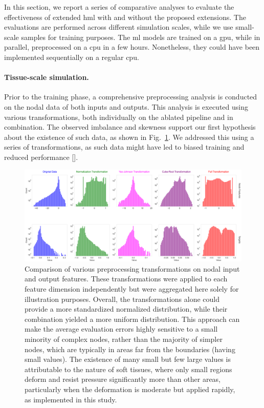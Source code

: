 In this section, we report a series of comparative analyses to evaluate the effectiveness of extended \ac{hml} with and without the proposed extensions. The evaluations are performed across different simulation scales, while we use small-scale samples for training purposes. The \ac{ml} models are trained on a \ac{gpu}, while in parallel, preprocessed on a \ac{cpu} in a few hours. Nonetheless, they could have been implemented sequentially on a regular \ac{cpu}.

\paragraph{Tissue-scale simulation.} Prior to the training phase, a comprehensive preprocessing analysis is conducted on the nodal data of both inputs and outputs. This analysis is executed using various transformations, both individually on the ablated pipeline and in combination. The observed imbalance and skewness support our first hypothesis about the existence of such data, as shown in Fig.~\ref{fig:normalization}. We addressed this using a series of transformations, as such data might have led to biased training and reduced performance [\cite{rezvani2023}].
%
\begin{figure}
    \centering
    \includegraphics[width=\textheight,keepaspectratio]{normalization.png}
    \caption{Comparison of various preprocessing transformations on nodal input and output features. These transformations were applied to each feature dimension independently but were aggregated here solely for illustration purposes. Overall, the transformations alone could provide a more standardized normalized distribution, while their combination yielded a more uniform distribution. This approach can make the average evaluation errors highly sensitive to a small minority of complex nodes, rather than the majority of simpler nodes, which are typically in areas far from the boundaries (having small values). The existence of many small but few large values is attributable to the nature of soft tissues, where only small regions deform and resist pressure significantly more than other areas, particularly when the deformation is moderate but applied rapidly, as implemented in this study.}
    \label{fig:normalization}
\end{figure}

